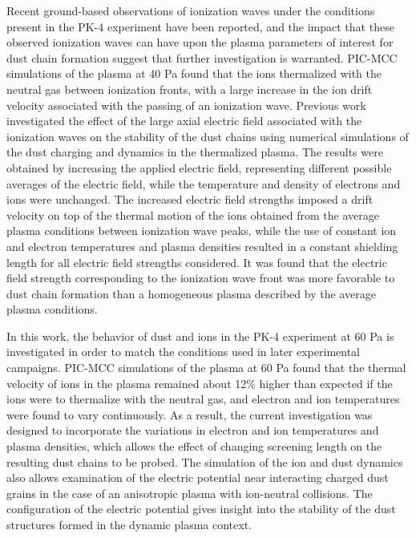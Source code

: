 \documentclass[aip,amsmath,amssymb,graphicx,floatfix,reprint]{revtex4-1}
\begin{document}
Recent ground-based observations of ionization waves under the conditions present in the PK-4 experiment have been reported\cite{Hartmann2020}, and the impact that these observed ionization waves can have upon the plasma parameters of interest for dust chain formation suggest that further investigation is warranted.  PIC-MCC simulations of the plasma at 40 Pa found that the ions thermalized with the neutral gas between ionization fronts, with a large increase in the ion drift velocity associated with the passing of an ionization wave\cite{Matthews2021}.  Previous work investigated the effect of the large axial electric field associated with the ionization waves on the stability of the dust chains using numerical simulations of the dust charging and dynamics in the thermalized plasma\cite{Matthews2021}.  The results were obtained by increasing the applied electric field, representing different possible averages of the electric field, while the temperature and density of electrons and ions were unchanged.  The increased electric field strengths imposed a drift velocity on top of the thermal motion of the ions obtained from the average plasma conditions between ionization wave peaks, while the use of constant ion and electron temperatures and plasma densities resulted in a constant shielding length for all electric field strengths considered.  It was found that the electric field strength corresponding to the ionization wave front was more favorable to dust chain formation than a homogeneous plasma described by the average plasma conditions. 

In this work, the behavior of dust and ions in the PK-4 experiment at 60 Pa is investigated in order to match the conditions used in later experimental campaigns.  PIC-MCC simulations of the plasma at 60 Pa found that the thermal velocity of ions in the plasma remained about 12$\%$ higher than expected if the ions were to thermalize with the neutral gas, and electron and ion temperatures were found to vary continuously\cite{Hartmann2020}.  As a result, the current investigation was designed to incorporate the variations in electron and ion temperatures and plasma densities, which allows the effect of changing screening length on the resulting dust chains to be probed.  The simulation of the ion and dust dynamics also allows examination of the electric potential near interacting charged dust grains in the case of an anisotropic plasma with ion-neutral collisions.  The configuration of the electric potential gives insight into the stability of the dust structures formed in the dynamic plasma context.
\end{document}

